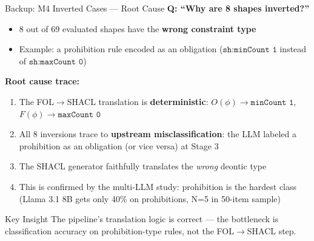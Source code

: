 \documentclass[aspectratio=169, 10pt]{beamer}
\begin{document}
\begin{frame}{Backup: M4 Inverted Cases --- Root Cause}
    \textbf{Q: ``Why are 8 shapes inverted?''}

    \vspace{0.2cm}
    \begin{itemize}
        \item 8 out of 69 evaluated shapes have the \textbf{wrong constraint type}
        \item Example: a prohibition rule encoded as an obligation ($\texttt{sh:minCount 1}$ instead of $\texttt{sh:maxCount 0}$)
    \end{itemize}

    \vspace{0.3cm}
    \textbf{Root cause trace:}
    \begin{enumerate}
        \item The FOL$\rightarrow$SHACL translation is \textbf{deterministic}: $O(\phi) \rightarrow \texttt{minCount 1}$, $F(\phi) \rightarrow \texttt{maxCount 0}$
        \item All 8 inversions trace to \textbf{upstream misclassification}: the LLM labeled a prohibition as an obligation (or vice versa) at Stage 3
        \item The SHACL generator faithfully translates the \textit{wrong} deontic type
        \item This is confirmed by the multi-LLM study: prohibition is the hardest class (Llama 3.1 8B gets only 40\% on prohibitions, N=5 in 50-item sample)
    \end{enumerate}

    \vspace{0.2cm}
    \begin{alertblock}{Key Insight}
        The pipeline's translation logic is correct --- the bottleneck is classification accuracy on prohibition-type rules, not the FOL$\rightarrow$SHACL step.
    \end{alertblock}
\end{frame}
\end{document}
